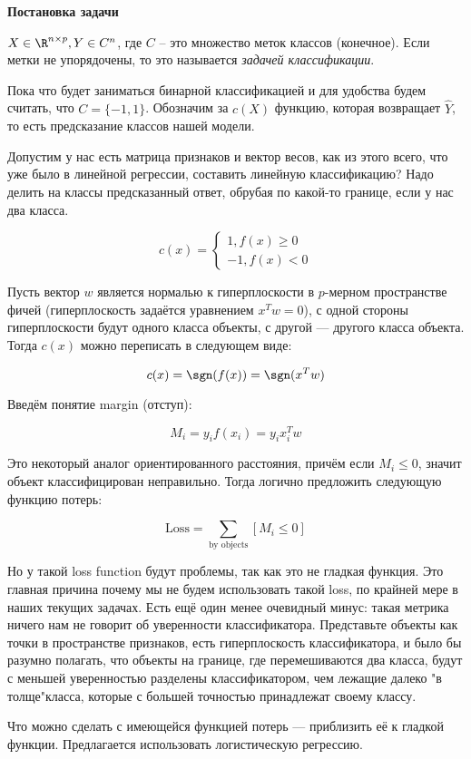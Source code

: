 \textbf{Постановка задачи}

$X \in \R^{n \times p}, Y \in C^n$, где $C$ -- это множество меток классов (конечное). Если метки не упорядочены, то это называется \textit{задачей классификации}.

Пока что будет заниматься бинарной классификацией и для удобства будем считать, что \(C = \{-1, 1\}\). Обозначим за $c(X)$ функцию, которая возвращает $\widehat{Y}$, то есть предсказание классов нашей модели.

Допустим у нас есть матрица признаков и вектор весов, как из этого всего, что уже было в линейной регрессии,
составить линейную классификацию?
Надо делить на классы предсказанный ответ, обрубая по какой-то границе, если у нас два класса.

\[
c(x) = 
\begin{cases}
1, f(x) \geqslant 0 \\
-1, f(x) < 0
\end{cases}
\]

Пусть вектор $w$ является нормалью к гиперплоскости в $p$-мерном пространстве фичей (гиперплоскость задаётся уравнением $x^T w = 0$), с одной стороны гиперплоскости будут одного класса объекты, с другой --- другого класса объекта. Тогда $c(x)$ можно переписать в следующем виде:

\[
c(x) = \sgn(f(x)) = \sgn(x^T w)
\]

Введём понятие margin (отступ):

\[
M_i = y_i f(x_i) = y_i x_i^T w
\]

Это некоторый аналог ориентированного расстояния, причём если $M_i \leqslant 0$, значит объект классифицирован неправильно. Тогда логично предложить следующую функцию потерь:

\[
\text{Loss} = \sum_{\text{by objects}} [M_i \leqslant 0]
\]

Но у такой loss function будут проблемы, так как это не гладкая функция. Это главная причина почему мы
не будем использовать такой loss, по крайней мере в наших текущих задачах. Есть ещё один менее очевидный
минус: такая метрика ничего нам не говорит об уверенности классификатора. Представьте объекты как точки
в пространстве признаков, есть гиперплоскость классификатора, и было бы разумно полагать, что объекты
на границе, где перемешиваются два класса, будут с меньшей уверенностью разделены классификатором, чем
лежащие далеко "в толще"класса, которые с большей точностью принадлежат своему классу.

Что можно сделать с имеющейся функцией потерь --- приблизить её к гладкой функции. Предлагается использовать логистическую регрессию.

